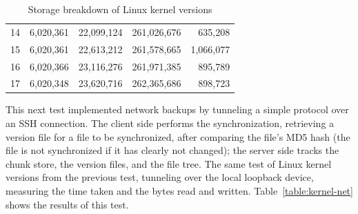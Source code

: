 \documentclass{article}
\begin{document}
\begin{table}[ht!]
\begin{center}
\begin{tabular}{!{\color[rgb]{.5,.5,.5}\vline}r!{\color[rgb]{.5,.5,.5}\vline}r!{\color[rgb]{.5,.5,.5}\vline}r!{\color[rgb]{.5,.5,.5}\vline}r!{\color[rgb]{.5,.5,.5}\vline}r!{\color[rgb]{.5,.5,.5}\vline}}
      14 & 6,020,361 & 22,099,124 & 261,026,676 &   635,208 \\
      15 & 6,020,361 & 22,613,212 & 261,578,665 & 1,066,077 \\
      16 & 6,020,366 & 23,116,276 & 261,971,385 &   895,789 \\
      17 & 6,020,348 & 23,620,716 & 262,365,686 &   898,723 \\ \hline
    \end{tabular}
    \caption{Storage breakdown of Linux kernel versions}
    \label{table:kernel2}
  \end{center}
\end{table}

This next test implemented network backups by tunneling a simple
protocol over an SSH connection. The client side performs the
synchronization, retrieving a version file for a file to be
synchronized, after comparing the file's MD5 hash (the file is not
synchronized if it has clearly not changed); the server side tracks
the chunk store, the version files, and the file tree. The same test
of Linux kernel versions from the previous test, tunneling over the
local loopback device, measuring the time taken and the bytes read and
written. Table~\ref{table:kernel-net} shows the results of this test.
\end{document}
